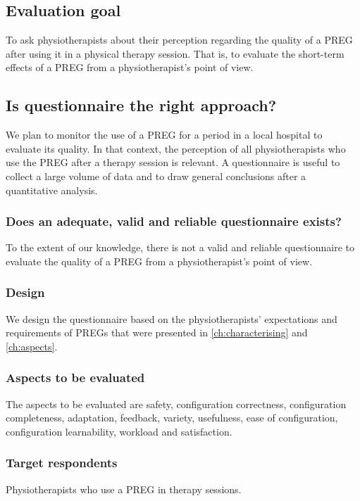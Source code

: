 \subsection{Evaluation goal}
To ask physiotherapists about their perception regarding the quality of a \ac{PREG} after using it in a physical therapy session. That is, to evaluate the short-term effects of a \ac{PREG} from a physiotherapist's point of view.

\subsection{Is questionnaire the right approach?}
We plan to monitor the use of a \ac{PREG} for a period in a local hospital to evaluate its quality. In that context, the perception of all physiotherapists who use the \ac{PREG} after a therapy session is relevant. A questionnaire is useful to collect a large volume of data and to draw general conclusions after a quantitative analysis.

\subsubsection{Does an adequate, valid and reliable questionnaire exists?}
To the extent of our knowledge, there is not a valid and reliable questionnaire to evaluate the quality of a \ac{PREG} from a physiotherapist's point of view.

\subsubsection{Design}
We design the questionnaire based on the physiotherapists' expectations and requirements of \acp{PREG} that were presented in \autoref{ch:characterising} and \autoref{ch:aspects}.

\subsubsection*{Aspects to be evaluated}
The aspects to be evaluated are safety, configuration correctness, configuration completeness, adaptation, feedback, variety, usefulness, ease of configuration, configuration learnability, workload and satisfaction.

\subsubsection*{Target respondents}
Physiotherapists who use a \ac{PREG} in therapy sessions.

